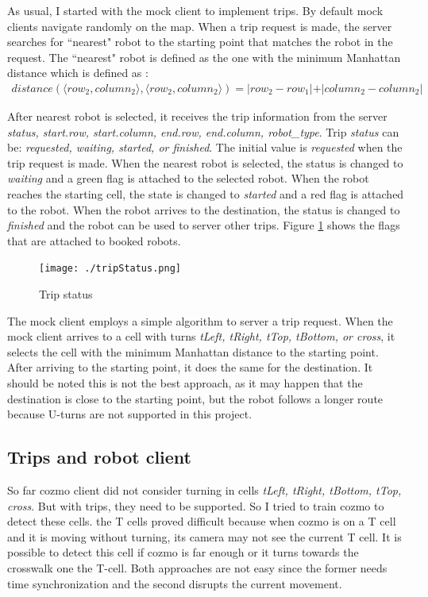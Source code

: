 \documentclass[12pt,a4paper]{article}
\begin{document}
As usual, I started with the mock client to implement trips. By default mock clients navigate randomly on the map. When a trip request is made, the server searches for ``nearest" robot to the starting point that matches the robot in the request. The ``nearest" robot is defined as the one with the minimum  Manhattan distance  which is defined as :
\begin{align*}
distance( \langle row_2, column_2\rangle, \langle row_2, column_2 \rangle) = \vert row_2 - row_1 \vert +  \vert column_2 - column_2 \vert
\end{align*}

After nearest robot is selected, it receives the trip information from the server \textit{status,  start.row, start.column,  end.row, end.column, robot\_type}. Trip \textit{status} can be: \textit{requested, waiting, started, or finished}. The initial value is \textit{requested} when the trip request is made. When the nearest robot is selected, the status is changed to \textit{waiting} and a green flag is attached to the selected robot. When the robot reaches the starting cell, the state is changed to \textit{started} and a red flag is attached to the robot. When the robot arrives to the destination, the status is changed to \textit{finished} and the robot can be used to server other trips. Figure \ref{fig:status} shows the flags that are attached to booked robots.

\begin{figure}
\center
\texttt{[image: ./tripStatus.png]}
\caption{Trip status} \label{fig:status}
\end{figure}

The mock client employs a simple algorithm to server a trip request. When the mock client arrives to a cell with turns \textit{tLeft, tRight, tTop, tBottom, or cross}, it selects the cell with the minimum Manhattan distance to the starting point. After arriving to the starting point, it does the same for the destination. 
It should be noted this is not the best approach, as it may happen that the destination is close to the starting point, but the robot follows a longer route because U-turns are not supported in this project. 

\subsection{Trips and robot client}

So far cozmo client did not consider turning in cells \textit{tLeft, tRight, tBottom, tTop, cross}. But with trips, they need to be supported. So I tried to train cozmo to detect these cells. the T cells proved difficult because when cozmo is on a T cell and it is moving without turning, its camera may not see the current T cell. It is possible to detect this cell if cozmo is far enough or it turns towards the crosswalk one the T-cell. Both approaches are not easy since the former needs time synchronization and the second disrupts the current movement. 
\end{document}

